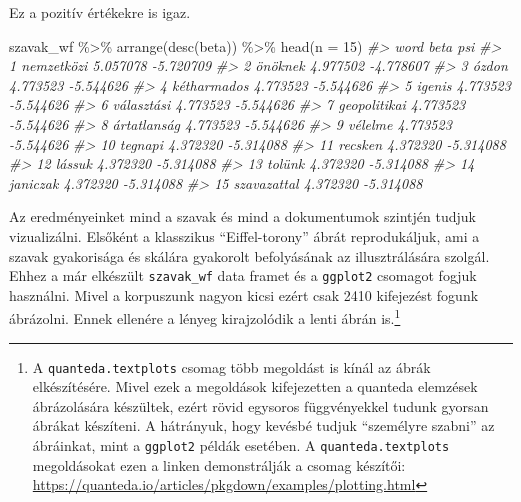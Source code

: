 \documentclass[
]{book}
\newenvironment{Shaded}{\begin{snugshade}}{\end{snugshade}}
\newcommand{\AttributeTok}[1]{\textcolor[rgb]{0.77,0.63,0.00}{#1}}
\newcommand{\CommentTok}[1]{\textcolor[rgb]{0.56,0.35,0.01}{\textit{#1}}}
\newcommand{\DecValTok}[1]{\textcolor[rgb]{0.00,0.00,0.81}{#1}}
\newcommand{\FunctionTok}[1]{\textcolor[rgb]{0.00,0.00,0.00}{#1}}
\newcommand{\NormalTok}[1]{#1}
\newcommand{\SpecialCharTok}[1]{\textcolor[rgb]{0.00,0.00,0.00}{#1}}
\begin{document}
Ez a pozitív értékekre is igaz.

\begin{Shaded}
\begin{Highlighting}[]
\NormalTok{szavak\_wf }\SpecialCharTok{\%\textgreater{}\%}
  \FunctionTok{arrange}\NormalTok{(}\FunctionTok{desc}\NormalTok{(beta)) }\SpecialCharTok{\%\textgreater{}\%}
  \FunctionTok{head}\NormalTok{(}\AttributeTok{n =} \DecValTok{15}\NormalTok{)}
\CommentTok{\#\textgreater{}            word     beta       psi}
\CommentTok{\#\textgreater{} 1    nemzetközi 5.057078 {-}5.720709}
\CommentTok{\#\textgreater{} 2       önöknek 4.977502 {-}4.778607}
\CommentTok{\#\textgreater{} 3         ózdon 4.773523 {-}5.544626}
\CommentTok{\#\textgreater{} 4   kétharmados 4.773523 {-}5.544626}
\CommentTok{\#\textgreater{} 5        igenis 4.773523 {-}5.544626}
\CommentTok{\#\textgreater{} 6    választási 4.773523 {-}5.544626}
\CommentTok{\#\textgreater{} 7  geopolitikai 4.773523 {-}5.544626}
\CommentTok{\#\textgreater{} 8   ártatlanság 4.773523 {-}5.544626}
\CommentTok{\#\textgreater{} 9       vélelme 4.773523 {-}5.544626}
\CommentTok{\#\textgreater{} 10      tegnapi 4.372320 {-}5.314088}
\CommentTok{\#\textgreater{} 11      recsken 4.372320 {-}5.314088}
\CommentTok{\#\textgreater{} 12       lássuk 4.372320 {-}5.314088}
\CommentTok{\#\textgreater{} 13       tolünk 4.372320 {-}5.314088}
\CommentTok{\#\textgreater{} 14     janiczak 4.372320 {-}5.314088}
\CommentTok{\#\textgreater{} 15  szavazattal 4.372320 {-}5.314088}
\end{Highlighting}
\end{Shaded}

Az eredményeinket mind a szavak és mind a dokumentumok szintjén tudjuk
vizualizálni. Elsőként a klasszikus ``Eiffel-torony'' ábrát
reprodukáljuk, ami a szavak gyakorisága és skálára gyakorolt
befolyásának az illusztrálására szolgál. Ehhez a már elkészült
\texttt{szavak\_wf} data framet és a \texttt{ggplot2} csomagot fogjuk
használni. Mivel a korpuszunk nagyon kicsi ezért csak 2410 kifejezést
fogunk ábrázolni. Ennek ellenére a lényeg kirajzolódik a lenti ábrán
is.\footnote{A \texttt{quanteda.textplots} csomag több megoldást is
  kínál az ábrák elkészítésére. Mivel ezek a megoldások kifejezetten a
  quanteda elemzések ábrázolására készültek, ezért rövid egysoros
  függvényekkel tudunk gyorsan ábrákat készíteni. A hátrányuk, hogy
  kevésbé tudjuk ``személyre szabni'' az ábráinkat, mint a
  \texttt{ggplot2} példák esetében. A \texttt{quanteda.textplots}
  megoldásokat ezen a linken demonstrálják a csomag készítői:
  \url{https://quanteda.io/articles/pkgdown/examples/plotting.html}}
\end{document}
